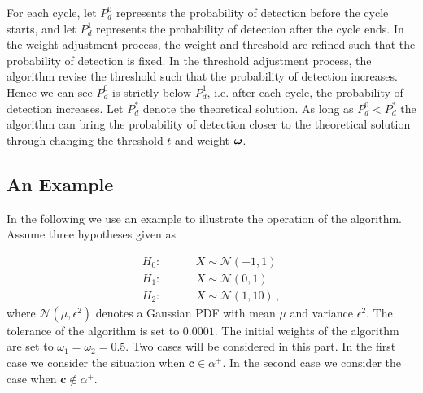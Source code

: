 For each cycle, let $P_d^0$ represents the probability of detection before the cycle starts, and let $P_d^1$ represents the probability of detection after the cycle ends. In the weight adjustment process, the weight and threshold are refined such that the probability of detection is fixed. In the threshold adjustment process, the algorithm revise the threshold such that the probability of detection increases. Hence we can see $P_d^0$ is strictly below $P_d^1$, i.e. after each cycle, the probability of detection increases. Let $P_d^\ast$ denote the theoretical solution. As long as $P_d^0 < P_d^\ast$  the algorithm can bring the probability of detection closer to the theoretical solution  through changing the threshold $t$ and weight $\boldsymbol{\omega}$.

\subsection{An Example}
In the following we use an example to illustrate the operation of the algorithm. Assume three hypotheses given as

\begin{equation}
\label{equ: Gaussian Hypothesis}
\begin{split}
	H_0:\;\;\;\;\;\;\;\;&X \sim \mathcal{N}(-1,1)\\
    H_1:\;\;\;\;\;\;\;\;&X \sim \mathcal{N}(0,1)\\
    H_2:\;\;\;\;\;\;\;\;&X \sim \mathcal{N}(1,10)\,,
\end{split}
\end{equation}
where $\mathcal{N}(\mu, \epsilon^2)$ denotes a Gaussian PDF with mean $\mu$ and variance $\epsilon^2$.
The tolerance of the algorithm is set to $0.0001$. The initial weights of the algorithm are set to $\omega_1 = \omega_2 = 0.5$. 
Two cases will be considered in this part. In the first case we consider the situation when $\mathbf{c} \in \alpha^+$. In the second case we consider the case when $\mathbf{c} \notin \alpha^+$.

